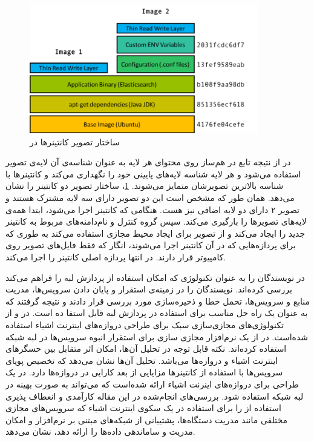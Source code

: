       \begin{figure}[]
        \centerline{\includegraphics[width=10cm]{graphics/chapter_2/docker_image}}
        \caption{ساختار تصویر کانتینر‌ها در  \cite{2019demystifying}}
        \label{fig:chapter_2:docker_image}
      \end{figure}

      در  از نتیجه تابع در هم‌ساز  روی محتوای هر لایه به عنوان شناسه‌ی آن لایه‌ی تصویر استفاده می‌شود و هر لایه شناسه لایه‌های پایینی خود را نگهداری می‌کند و کانتینر‌ها با شناسه بالاترین تصویرشان متمایز می‌شوند.
      \cref{fig:chapter_2:docker_image}، ساختار تصویر دو کانتینر را نشان می‌دهد.
      همان طور که مشخص است این دو تصویر دارای سه لایه مشترک هستند و تصویر ۲ دارای دو لایه اضافی نیز هست.
      هنگامی که کانتینر اجرا می‌شود،  ابتدا همه‌ی لایه‌های تصویر‌ها را بارگیری می‌کند.
      سپس گروه کنترل و نام‌دامنه‌های مربوط به کانتینر جدید را ایجاد می‌کند و از تصویر برای ایجاد محیط مجازی استفاده می‌کند به طوری که برای پردازه‌هایی که در آن کانتینر اجرا می‌شوند، انگار که فقط فایل‌های تصویر روی کامپیوتر قرار دارند.
      در انتها پردازه اصلی کانتینر را اجرا می‌کند.

      در \cite{ismail2015evaluation} نویسندگان  را به عنوان تکنولوژی که امکان استفاده از پردازش لبه را فراهم می‌کند بررسی کرده‌اند.
      نویسندگان  را در زمینه‌ی استقرار و پایان دادن سرویس‌ها، مدریت منابع و سرویس‌ها، تحمل خطا و ذخیره‌سازی مورد بررسی قرار دادند و نتیجه گرفتند که  به عنوان یک راه حل مناسب برای استفاده در پردازش لبه قابل استفا ده است.
      در \cite{viswanath2016system} و \cite{morabito2016enabling} از تکنولوژی‌های مجازی‌سازی سبک برای طراحی دروازه‌های اینترنت اشیاء استفاده شده‌است.
      در \cite{viswanath2016system} از یک نرم‌افزار مجازی سازی برای استقرار انبوه سرویس‌ها در لبه شبکه استفاده کرده‌اند.
      نکته قابل توجه در تحلیل آن‌ها، امکان اثر متقابل بین حسگر‌های اینترنت اشیاء و دروازه‌‌ها می‌باشد.
      تحلیل آن‌ها نشان می‌دهد که تخصیص پویای سرویس‌ها با استفاده از کانتینر‌ها مزایایی از بعد کارایی در دروازه‌ها دارد.
      در \cite{morabito2016enabling} یک طراحی برای دروازه‌های اینرنت اشیاء ارائه شده‌است که می‌تواند به صورت بهینه در لبه شبکه استفاده شود.
      بررسی‌های انجام‌شده در این مقاله کارآمدی و انعطاف پذیری استفاده از  را برای استفاده در یک سکوی‌ اینترنت اشیاء که سرویس‌های مجازی مختلفی مانند مدریت دستگاه‌ها، پشتیبانی از شبکه‌های مبتنی بر نرم‌افزار و امکان مدریت و ساماندهی داده‌ها را ارائه دهد، نشان می‌دهد.

